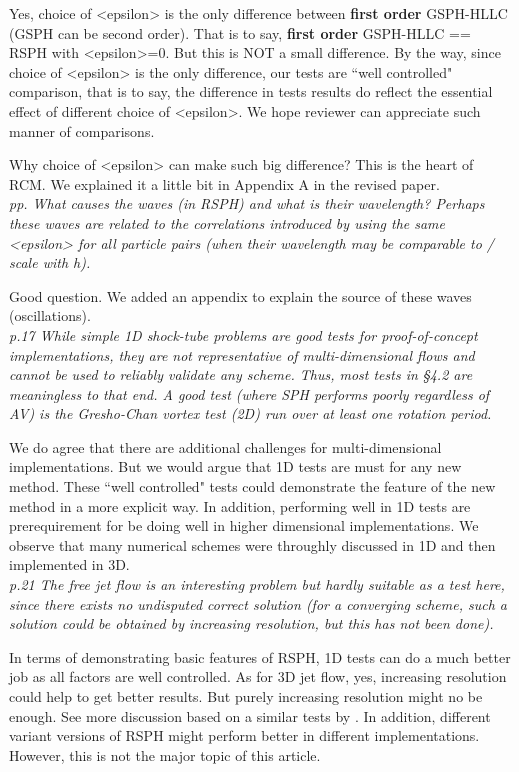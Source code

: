 \documentclass[10pt,a4paper]{article}
\begin{document}
Yes, choice of <epsilon> is the only difference between \textbf{first order} GSPH-HLLC (GSPH can be second order). That is to say, \textbf{first order} GSPH-HLLC == RSPH with <epsilon>=0.
But this is NOT a small difference.
By the way, since choice of <epsilon> is the only difference, our tests are ``well controlled" comparison, that is to say, the difference in tests results do reflect the essential effect of different choice of <epsilon>. We hope reviewer can appreciate such manner of comparisons.

Why choice of <epsilon> can make such big difference? This is the heart of RCM. We explained it a little bit in Appendix A in the revised paper. 
\\[3pt]

\textit{pp. What causes the waves (in RSPH) and what is their wavelength? Perhaps
these waves are related to the correlations introduced by using the same
<epsilon> for all particle pairs (when their wavelength may be comparable
to / scale with h).}

Good question. We added an appendix to explain the source of these waves (oscillations).
\\[3pt]

\textit{p.17 While simple 1D shock-tube problems are good tests for proof-of-concept implementations, they are not representative of
multi-dimensional flows and cannot be used to reliably validate any scheme. Thus, most tests in §4.2 are meaningless to that end.
A good test (where SPH performs poorly regardless of AV) is the Gresho-Chan vortex test (2D) run over at least one rotation period.}

We do agree that there are additional challenges for multi-dimensional implementations. But we would argue that 1D tests are must for any new method. These ``well controlled" tests could demonstrate the feature of the new method in a more explicit way. In addition, performing well in 1D tests are prerequirement for be doing well in higher dimensional implementations. We observe that many numerical schemes were throughly discussed in 1D and then implemented in 3D.
\\[3pt]

\textit{p.21 The free jet flow is an interesting problem but hardly suitable as a
test here, since there exists no undisputed correct solution (for a converging scheme, such a solution could be obtained by increasing resolution, but this has not been done).}

In terms of demonstrating basic features of RSPH, 1D tests can do a much better job as all factors are well controlled. 
As for 3D jet flow, yes, increasing resolution could help to get better results. But purely increasing resolution might no be enough. See more discussion based on a similar tests by \citet{cha2010kelvin}. 
In addition, different variant versions of RSPH might perform better in different implementations. However, this is not the major topic of this article.
\\[3pt]
\end{document}
